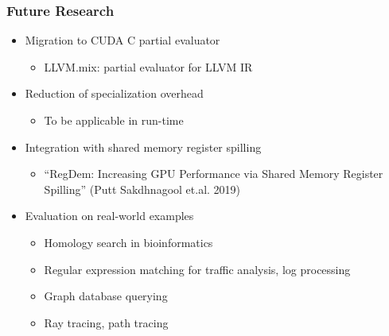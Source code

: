\documentclass[xcolor=table,aspectratio=169]{beamer}
\begin{document}
\begin{frame}[fragile] \frametitle{Future Research}
  \begin{itemize}
    \item Migration to CUDA C partial evaluator
    \begin{itemize}
      \item LLVM.mix: partial evaluator for LLVM IR
    \end{itemize}
    \item Reduction of specialization overhead
    \begin{itemize}
      \item To be applicable in run-time
    \end{itemize}
    \item Integration with shared memory register spilling
    \begin{itemize}
      \item ``RegDem: Increasing GPU Performance via Shared Memory Register Spilling'' (Putt Sakdhnagool et.al. 2019)
    \end{itemize}
    \item Evaluation on real-world examples
    \begin{itemize}
      \item Homology search in bioinformatics
      \item Regular expression matching for traffic analysis, log processing
      \item Graph database querying
      \item Ray tracing, path tracing
    \end{itemize}
  \end{itemize}
\end{frame}
\end{document}
